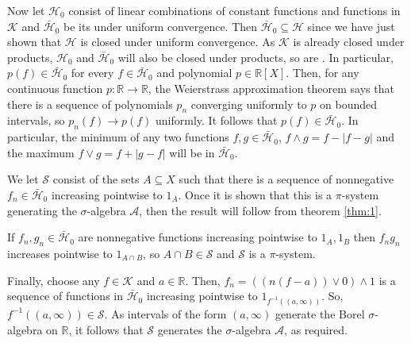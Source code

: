 \documentclass[12pt]{article}
\begin{document}
Now let $\mathcal{H}_0$ consist of linear combinations of constant functions and functions in $\mathcal{K}$ and $\mathcal{\bar H}_0$ be its  under uniform convergence. Then $\mathcal{\bar H}_0\subseteq\mathcal{H}$ since we have just shown that $\mathcal{H}$ is closed under uniform convergence.
As $\mathcal{K}$ is already closed under products, $\mathcal{H}_0$ and $\mathcal{\bar H}_0$ will also be closed under products, so are . In particular, $p(f)\in\mathcal{\bar H}_0$ for every $f\in\mathcal{\bar H}_0$ and polynomial $p\in\mathbb{R}[X]$.
Then, for any continuous function $p\colon\mathbb{R}\rightarrow\mathbb{R}$, the Weierstrass approximation theorem says that there is a sequence of polynomials $p_n$ converging uniformly to $p$ on bounded intervals, so $p_n(f)\rightarrow p(f)$ uniformly. It follows that $p(f)\in\mathcal{\bar H}_0$. In particular, the minimum of any two functions $f,g\in\mathcal{\bar H}_0$, $f\wedge g = f-|f-g|$ and the maximum $f\vee g=f+|g-f|$ will be in $\mathcal{\bar H}_0$.

We let $\mathcal{S}$ consist of the sets $A\subseteq X$ such that there is a sequence of nonnegative $f_n\in\mathcal{\bar H}_0$ increasing pointwise to $1_A$. Once it is shown that this is a $\pi$-system generating the $\sigma$-algebra $\mathcal{A}$, then the result will follow from theorem \ref{thm:1}.

If $f_n,g_n\in\mathcal{\bar H}_0$ are nonnegative functions increasing pointwise to $1_A,1_B$ then $f_ng_n$ increases pointwise to $1_{A\cap B}$, so $A\cap B\in\mathcal{S}$ and $\mathcal{S}$ is a $\pi$-system.

Finally, choose any $f\in\mathcal{K}$ and $a\in\mathbb{R}$. Then, $f_n=((n(f-a))\vee 0)\wedge 1$ is a sequence of functions in $\mathcal{\bar H}_0$ increasing pointwise to $1_{f^{-1}((a,\infty))}$. So, $f^{-1}((a,\infty))\in\mathcal{S}$. As intervals of the form $(a,\infty)$ generate the Borel $\sigma$-algebra on $\mathbb{R}$, it follows that $\mathcal{S}$ generates the $\sigma$-algebra $\mathcal{A}$, as required.

\end{document}
